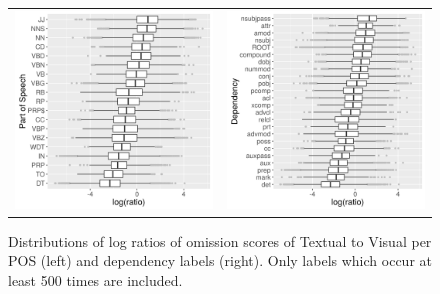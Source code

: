 \begin{figure}[t]
  \centering
  \hspace*{-0.2in}
  \setlength{\tabcolsep}{0pt}
  \begin{tabular}{cc}
  \includegraphics[scale=0.55]{imaginet-omission-ratio-pos-boxplot.png} &
  \includegraphics[scale=0.55]{imaginet-omission-ratio-dep-boxplot.png} \\  
  \end{tabular}
  \caption{Distributions of log ratios of omission scores of {\sc Textual} to {\sc Visual} per
    POS (left) and dependency labels (right). Only labels which occur at least 500 times are included.}
\label{fig:omission-imaginet-ratio}
\end{figure}



